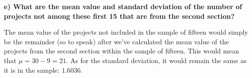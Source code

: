 \documentclass[12pt, letter]{article}
\begin{document}
\qquad \textbf{e) What are the mean value and standard deviation of the number of projects not among these first 15 that are from the second section?}
\begin{center}
	The mean value of the projects not included in the sample of fifteen would simply be the remainder (so to speak) after we've calculated the mean value of the projects from the second section within the sample of fifteen. This would mean that $\mu = 30 - 9 = \boxed{21}$. As for the standard deviation, it would remain the same as it is in the sample: $\boxed{1.6036}$.
\end{center}
\end{document}
